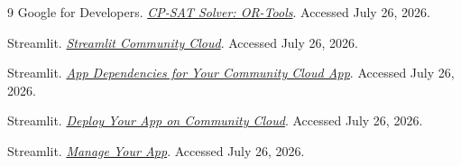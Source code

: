 \documentclass[11pt]{article}
\begin{document}
\begingroup
\small
\setlength{\parskip}{2pt}
\begin{thebibliography}{9}
Google for Developers. \href{https://developers.google.com/optimization/cp/cp_solver}
{\emph{CP-SAT Solver: OR-Tools}}. Accessed July 26, 2026.

Streamlit. \href{https://docs.streamlit.io/deploy/streamlit-community-cloud}
{\emph{Streamlit Community Cloud}}. Accessed July 26, 2026.

Streamlit.
\href{https://docs.streamlit.io/deploy/streamlit-community-cloud/deploy-your-app/app-dependencies}
{\emph{App Dependencies for Your Community Cloud App}}. Accessed July 26, 2026.

Streamlit.
\href{https://docs.streamlit.io/deploy/streamlit-community-cloud/deploy-your-app/deploy}
{\emph{Deploy Your App on Community Cloud}}. Accessed July 26, 2026.

Streamlit. \href{https://docs.streamlit.io/deploy/streamlit-community-cloud/manage-your-app}
{\emph{Manage Your App}}. Accessed July 26, 2026.
\end{thebibliography}
\endgroup
\end{document}
